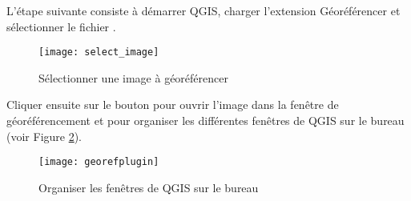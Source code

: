 L'étape suivante consiste à démarrer QGIS, charger l'extension Géoréférencer et sélectionner le fichier .


\begin{figure}[ht]
\begin{center}
\caption{Sélectionner une image à géoréférencer \nixcaption}\label{fig:select_image}\smallskip
  \texttt{[image: select\_image]}
\end{center}
\end{figure}


Cliquer ensuite sur le bouton  pour ouvrir l'image dans
la fenêtre de géoréférencement et pour organiser les différentes fenêtres de QGIS sur
le bureau (voir Figure \ref{fig:georefplugin}).


\begin{figure}[ht]
\begin{center}
  \caption{Organiser les fenêtres de QGIS sur le bureau \nixcaption}\label{fig:georefplugin}\smallskip
  \texttt{[image: georefplugin]}
\end{center}
\end{figure}



